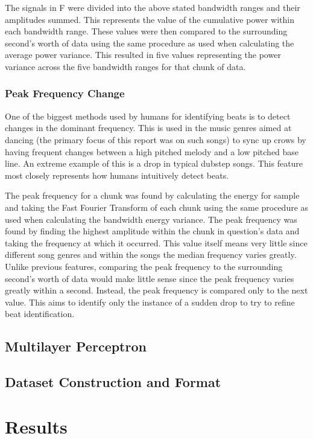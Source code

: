 \documentclass[12pt]{article}
\begin{document}
The signals in F were divided into the above stated bandwidth ranges and their amplitudes summed. This represents the value of the cumulative power within each bandwidth range. These values were then compared to the surrounding second's worth of data using the same procedure as used when calculating the average power variance. This resulted in five values representing the power variance across the five bandwidth ranges for that chunk of data.

\subsubsection{Peak Frequency Change}
One of the biggest methods used by humans for identifying beats is to detect changes in the dominant frequency. This is used in the music genres aimed at dancing (the primary focus of this report was on such songs) to sync up crows by having frequent changes between a high pitched melody and a low pitched base line. An extreme example of this is a drop in typical dubstep songs. This feature most closely represents how humans intuitively detect beats.

The peak frequency for a chunk was found by calculating the energy for sample and taking the Fast Fourier Transform of each chunk using the same procedure as used when calculating the bandwidth energy variance. The peak frequency was found by finding the highest amplitude within the chunk in question's data and taking the frequency at which it occurred. This value itself means very little since different song genres and within the songs the median frequency varies greatly. Unlike previous features, comparing the peak frequency to the surrounding second's worth of data would make little sense since the peak frequency varies greatly within a second. Instead, the peak frequency is compared only to the next value. This aims to identify only the instance of a sudden drop to try to refine beat identification.

\subsection{Multilayer Perceptron}


\subsection{Dataset Construction and Format}



\section{Results}
\end{document}
